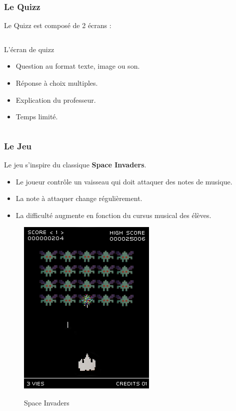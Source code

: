 \begin{frame}
  \frametitle{Le Quizz}
  Le Quizz est composé de 2 écrans :
  \begin{columns}[t]
    \begin{column}{10cm}
      \begin{exampleblock}{L'écran de quizz}
	\begin{itemize}
        \item Question au format texte, image ou son.
        \item Réponse à choix multiples.
        \item Explication du professeur.
        \item Temps limité.
        \end{itemize}
      \end{exampleblock} 
    \end{column}
  \end{columns}  
\end{frame}

\begin{frame}
  \frametitle{Le Jeu}
  Le jeu s'inspire du classique \textbf{Space Invaders}.
  \begin{itemize}
    \item Le joueur contrôle un vaisseau qui doit attaquer des notes de musique.    \item La note à attaquer change régulièrement.
    \item La difficulté augmente en fonction du cursus musical des élèves.  
  \end{itemize}

  \begin{figure}[!h]
    \centering
    \includegraphics[height = 0.5\textheight]{img/Space_Invaders.png}
    \label{Space Invaders} 
    \caption{Space Invaders}
  \end{figure}
\end{frame}

